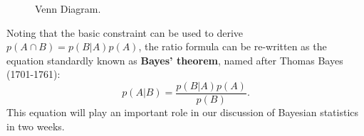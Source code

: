 \documentclass[11pt]{article}
\theoremstyle{definition}
\theoremstyle{remark}
\begin{document}
\begin{figure}[]
\centering
{}
\caption{Venn Diagram.}
\label{fig:vennAB}
\end{figure}


Noting that the basic constraint can be used to derive $p(A\cap B)=p(B|A)p(A)$, the ratio formula can be re-written as the equation standardly known as \textbf{Bayes' theorem}, named after Thomas Bayes (1701-1761):
$$p(A|B) = \frac{p(B|A)p(A)}{p(B)}.$$
This equation will play an important role in our discussion of Bayesian statistics in two weeks.\par 
\end{document}
